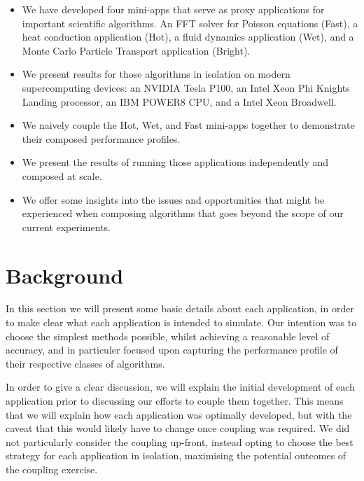 \documentclass[runningheads,a4paper]{llncs}
\begin{document}
\begin{itemize}
  \item We have developed four mini-apps that serve as proxy applications for important scientific algorithms. An FFT solver for Poisson equations (Fast), a heat conduction application (Hot), a fluid dynamics application (Wet), and a Monte Carlo Particle Transport application (Bright).

\item We present results for those algorithms in isolation on modern supercomputing devices: an NVIDIA Tesla P100, an Intel Xeon Phi Knights Landing processor, an IBM POWER8 CPU, and a Intel Xeon Broadwell.

\item We naively couple the Hot, Wet, and Fast mini-apps together to demonstrate their composed performance profiles.

  \item We present the results of running those applications independently and composed at scale.

    \item We offer some insights into the issues and opportunities that might be experienced when composing algorithms that goes beyond the scope of our current experiments.

\end{itemize}

\section{Background}

In this section we will present some basic details about each application, in order to make clear what each application is intended to simulate. Our intention was to choose the simplest methods possible, whilst achieving a reasonable level of accuracy, and in particuler focused upon capturing the performance profile of their respective classes of algorithms.

In order to give a clear discussion, we will explain the initial development of each application prior to discussing our efforts to couple them together. This means that we will explain how each application was optimally developed, but with the caveat that this would likely have to change once coupling was required. We did not particularly consider the coupling up-front, instead opting to choose the best strategy for each application in isolation, maximising the potential outcomes of the coupling exercise.
\end{document}
